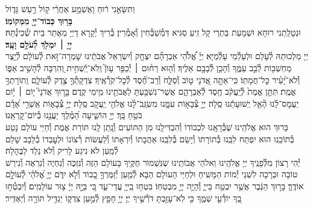 \documentclass[twoside, openany, parskip=half, 11pt]{book}
\begin{document}
{וַתִּשָּׂאֵ֣נִי ר֔וּחַ וָאֶשְׁמַ֣ע אַחֲרַ֔י ק֖וֹל רַ֣עַשׁ גָּד֑וֹל\\
\textbf{בָּר֥וּךְ כְּבוֹד־יְיָ֖ מִמְּקוֹמֽוֹ׃} \\
וּנְטָלַֽתְנִי רוּחָא וּשְׁמָעֵת בַּתְרַי קָל זִֽיעַ סַגִּיא דִּמְ֯שַׁבְּ֯חִין וְ֯אָמְ֯רִין׃ בְּ֯רִיךְ יְ֯קָרָא דַיְיָ מֵאֲתַר בֵּית שְׁ֯כִינְ֯תֵּהּ׃\\
\textbf{יְיָ֥ ׀ יִמְלֹ֖ךְ לְ֯עֹלָ֥ם וָעֶֽד׃} \\
יְיָ מַלְכוּתֵהּ לְ֯עָלַם וּלְעַלְ֯מֵי עָלְ֯מַיָּא׃ יְיָ֗
%
אֱ֠לֹהֵ֠י אַבְרָהָ֞ם יִצְחָ֤ק וְ֯יִשְׂרָאֵל֙ אֲבֹתֵ֔ינוּ שׇׁמְרָה־זֹּ֣את לְ֯עוֹלָ֔ם לְ֯יֵ֥צֶר מַחְשְׁב֖וֹת לְ֯בַ֣ב עַמֶּ֑ךָ וְ֯הָכֵ֥ן לְ֯בָבָ֖ם אֵלֶֽיךָ׃ וְ֯ה֤וּא
%
רַח֨וּם ׀ יְ֯כַפֵּ֥ר עָוֺן֮ וְֽלֹא־יַֽ֫שְׁחִ֥ית וְ֭הִרְבָּה לְ֯הָשִׁ֣יב אַפּ֑וֹ וְ֯לֹא־יָ֝עִ֗יר כׇּל־חֲמָתֽוֹ׃ כִּֽי־אַתָּ֣ה
%
אֲ֭דֹנָי ט֣וֹב וְ֯סַלָּ֑ח וְ֯רַב־חֶ֗֝סֶד לְ֯כׇל־קֹֽרְ֯אֶֽיךָ׃ צִדְקָתְ֯ךָ֣
%
צֶ֣דֶק לְ֯עוֹלָ֑ם וְֽתוֹרָתְךָ֥ אֱמֶֽת׃ תִּתֵּ֤ן
%
אֱמֶת֙ לְ֯יַֽעֲקֹ֔ב חֶ֖סֶד לְ֯אַבְרָהָ֑ם אֲשֶׁר־נִשְׁבַּ֥עְתָּ לַאֲבֹתֵ֖ינוּ מִ֥ימֵי קֶֽדֶם׃ בָּ֤ר֣וּךְ
%
אֲדֹנָי֮ י֤וֹם ׀ י֥֫וֹם יַעֲמׇס־לָ֗נוּ הָ֘אֵ֤ל יְֽשׁוּעָתֵ֬נוּ סֶֽלָה׃ יְיָ֣
%
צְ֯בָא֣וֹת עִמָּ֑נוּ מִשְׂגָּֽב־לָ֨נוּ אֱלֹהֵ֖י יַֽעֲקֹ֣ב סֶֽלָה׃ יְיָ֥
%
צְ֯בָא֑וֹת אַֽשְׁרֵ֥י אָ֝דָ֗ם בֹּטֵ֥חַ בָּֽךְ׃ יְיָ֥
%
הוֹשִׁ֑יעָה הַ֝מֶּ֗לֶךְ יַעֲנֵ֥נוּ בְ֯יוֹם־קׇרְאֵֽנוּ׃ \\
בָּרוּךְ הוּא אֱלֹהֵֽינוּ שֶׁבְּ֯רָאָֽנוּ לִכְבוֹדוֹ וְ֯הִבְדִּילָֽנוּ מִן הַתּוֹעִים וְ֯נָֽתַן לָֽנוּ תּוֹרַת אֱמֶת וְ֯חַיֵּי עוֹלָם נָטַע בְּ֯תוֹכֵֽנוּ הוּא יִפְתַּח לִבֵּֽנוּ בְּ֯תוֹרָתוֹ וְ֯יָשֵׂם בְּ֯לִבֵּֽנוּ אַהֲבָתוֹ וְ֯יִרְאָתוֹ וְ֯לַעֲשׂוֹת רְ֯צוֹנוֹ וּלְעׇבְדוֹ בְ֯לֵבָב שָׁלֵם לְ֯מַֽעַן לֹא נִיגַע לָרִיק וְ֯לֹא נֵלֵד לַבֶּהָלָה׃\\
יְ֯הִי רָצוֹן מִלְּ֯פָנֶֽיךָ יְיָ אֱלֹהֵֽינוּ וֵאלֹהֵי אֲבוֹתֵֽינוּ שֶׁנִּשְׁמוֹר חֻקֶּֽיךָ בָּעוֹלָם הַזֶּה וְ֯נִזְכֶּה וְ֯נִחְיֶה וְ֯נִרְאֶה וְ֯נִירַשׁ טוֹבָה וּבְרָכָה לִשְׁנֵי יְ֯מוֹת הַמָּשִֽׁיחַ וּלְחַיֵּי הָעוֹלָם הַבָּא׃ לְ֯מַ֤עַן יְ֯זַמֶּרְךָ֣ כָ֭בוֹד וְ֯לֹ֣א יִדֹּ֑ם יְיָ֥ אֱ֝לֹהַ֗י לְ֯עוֹלָ֣ם אוֹדֶֽךָּ׃ בָּר֣וּךְ הַגֶּ֔בֶר אֲשֶׁ֥ר יִבְטַ֖ח בַּייָ֑ וְ֯הָיָ֥ה יְיָ֖ מִבְטַחֽוֹ׃ בִּטְח֥וּ
%
בַֽייָ֖ עֲדֵי־עַ֑ד כִּ֚י בְּיׇ֣הּ יְיָ֔ צ֖וּר עוֹלָמִֽים׃ וְ֯יִבְטְ֯ח֣וּ
%
בְ֭ךָ יוֹדְ֯עֵ֣י שְׁמֶ֑ךָ כִּ֤י לֹֽא־עָזַ֖בְתָּ דֹרְ֯שֶׁ֣יךָ יְיָ׃ יְיָ֥
%
חָפֵ֖ץ לְ֯מַ֣עַן צִדְק֑וֹ יַגְדִּ֥יל תּוֹרָ֖ה וְ֯יַאְדִּֽיר׃
}
\end{document}
